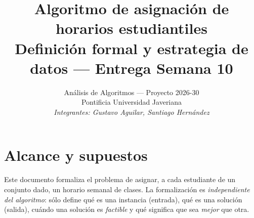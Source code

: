 \documentclass[11pt,letterpaper]{article}
\title{Algoritmo de asignación de horarios estudiantiles\\
\large Definición formal y estrategia de datos --- Entrega Semana 10}
\author{Análisis de Algoritmos --- Proyecto 2026-30\\
Pontificia Universidad Javeriana\\[2pt]
\textit{Integrantes: Gustavo Aguilar, Santiago Hernández}}
\date{}
\theoremstyle{definition}
\theoremstyle{remark}
\theoremstyle{plain}
\begin{document}
\maketitle

\section{Alcance y supuestos}
Este documento formaliza el problema de asignar, a cada estudiante de un
conjunto dado, un horario semanal de clases. La formalización es
\emph{independiente del algoritmo}: sólo define qué es una instancia
(entrada), qué es una solución (salida), cuándo una solución es
\emph{factible} y qué significa que sea \emph{mejor} que otra.
\end{document}
